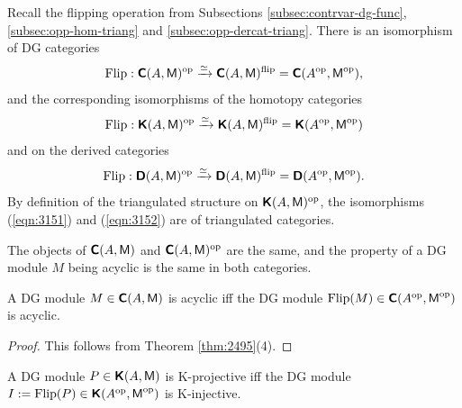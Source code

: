 Recall the flipping operation from Subsections \ref{subsec:contrvar-dg-func}, 
\ref{subsec:opp-hom-triang} and \ref{subsec:opp-dercat-triang}.
There is an isomorphism of DG categories 
\begin{equation} \label{eqn:3150}
\operatorname{Flip} : \boldsymbol{\mathsf{C}}(A, \operatorname{\mathsf{M}})^{\mathrm{op}} \xrightarrow{\simeq} 
\boldsymbol{\mathsf{C}}(A, \operatorname{\mathsf{M}})^{\mathrm{flip}} = 
\boldsymbol{\mathsf{C}}(A^{\mathrm{op}}, \operatorname{\mathsf{M}}^{\mathrm{op}}) , 
\end{equation}
and the corresponding isomorphisms of the homotopy categories
\begin{equation} \label{eqn:3151}
\operatorname{Flip} : \boldsymbol{\mathsf{K}}(A, \operatorname{\mathsf{M}})^{\mathrm{op}} \xrightarrow{\simeq} 
\boldsymbol{\mathsf{K}}(A, \operatorname{\mathsf{M}})^{\mathrm{flip}} = 
\boldsymbol{\mathsf{K}}(A^{\mathrm{op}}, \operatorname{\mathsf{M}}^{\mathrm{op}})
\end{equation}
and on the derived categories
\begin{equation} \label{eqn:3152}
\operatorname{Flip} : \boldsymbol{\mathsf{D}}(A, \operatorname{\mathsf{M}})^{\mathrm{op}} \xrightarrow{\simeq} 
\boldsymbol{\mathsf{D}}(A, \operatorname{\mathsf{M}})^{\mathrm{flip}} = 
\boldsymbol{\mathsf{D}}(A^{\mathrm{op}}, \operatorname{\mathsf{M}}^{\mathrm{op}}) . 
\end{equation}
By definition of the triangulated structure on 
$\boldsymbol{\mathsf{K}}(A, \operatorname{\mathsf{M}})^{\mathrm{op}}$,
the isomorphisms (\ref{eqn:3151}) and  (\ref{eqn:3152})
are of triangulated categories. 

The objects of $\boldsymbol{\mathsf{C}}(A, \operatorname{\mathsf{M}})$ and
$\boldsymbol{\mathsf{C}}(A, \operatorname{\mathsf{M}})^{\mathrm{op}}$ are the same, and the property of a DG module 
$M$ being acyclic is the same in both categories. 

\begin{lem} \label{lem:3150}
A DG module $M \in \boldsymbol{\mathsf{C}}(A, \operatorname{\mathsf{M}})$ is acyclic iff the DG module \lb 
$\operatorname{Flip}(M) \in \boldsymbol{\mathsf{C}}(A^{\mathrm{op}}, \operatorname{\mathsf{M}}^{\mathrm{op}})$
is acyclic. 
\end{lem}

\begin{proof}
This follows from Theorem \ref{thm:2495}(4). 
\end{proof}

\begin{lem} \label{lem:3151}
A DG module $P \in \boldsymbol{\mathsf{K}}(A, \operatorname{\mathsf{M}})$ is K-projective iff
the DG module 
$I := \operatorname{Flip}(P) \in \boldsymbol{\mathsf{K}}(A^{\mathrm{op}}, \operatorname{\mathsf{M}}^{\mathrm{op}})$
is K-injective. 
\end{lem}

